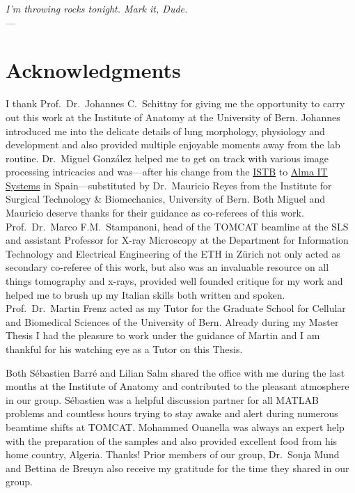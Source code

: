 
\begin{flushright}{\slshape I'm throwing rocks tonight. Mark it, Dude.} \\ \medskip
    ---  \citep{TheBigLebowski}
\end{flushright}

\bigskip
\begingroup
\let\clearpage\relax
\let\cleardoublepage\relax
\let\cleardoublepage\relax
\chapter*{Acknowledgments}
I thank Prof.\ Dr.\ Johannes C.\ Schittny for giving me the opportunity to carry out this work at the Institute of Anatomy at the University of Bern. Johannes introduced me into the delicate details of lung morphology, physiology and development and also provided multiple enjoyable moments away from the lab routine. Dr.\ Miguel González helped me to get on track with various image processing intricacies and was---after his  change from the \href{http://www.istb.unibe.ch/}{ISTB} to \href{http://www.alma3d.com/en}{Alma IT Systems} in Spain---substituted by Dr.\ Mauricio Reyes from the Institute for Surgical Technology \& Biomechanics, University of Bern. Both Miguel and Mauricio deserve thanks for their guidance as co-referees of this work. Prof.\ Dr.\ Marco F.M.\ Stampanoni, head of the \acs{TOMCAT} beamline at the \acl{SLS} and assistant Professor for X-ray Microscopy at the Department for Information Technology and Electrical Engineering of the ETH in Zürich not only acted as secondary co-referee of this work, but also was an invaluable resource on all things tomography and x-rays, provided well founded critique for my work and helped me to brush up my Italian skills both written and spoken. Prof.\ Dr.\ Martin Frenz acted as my Tutor for the Graduate School for Cellular and Biomedical Sciences of the University of Bern. Already during my Master Thesis I had the pleasure to work under the guidance of  Martin and I am thankful for his watching eye as a Tutor on this Thesis.

Both Sébastien Barré and Lilian Salm shared the office with me during the last months at the Institute of Anatomy and contributed to the pleasant atmosphere in our group. Sébastien was a helpful discussion partner for all MATLAB problems and countless hours trying to stay awake and alert during numerous beamtime shifts at \acs{TOMCAT}. Mohammed Ouanella was always an expert help with the preparation of the samples and also provided excellent food from his home country, Algeria. Thanks! Prior members of our group, Dr.\ Sonja Mund and Bettina de Breuyn also receive my gratitude for the time they shared in our group.

